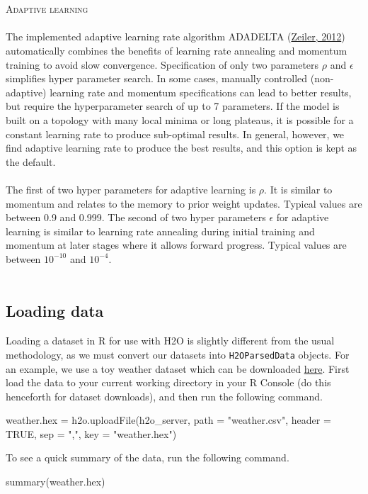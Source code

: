 \documentclass[12pt]{article}
\begin{document}
\\
\\
\textsc{Adaptive learning}
\\
\\
\noindent
The implemented adaptive learning rate algorithm ADADELTA (\href{http://arxiv.org/pdf/1212.5701v1.pdf}{Zeiler, 2012})  automatically combines the benefits of learning rate annealing and momentum training to avoid slow convergence. Specification of only two parameters $\rho$ and $\epsilon$  simplifies hyper parameter search. In some cases, manually controlled (non-adaptive) learning rate and momentum specifications can lead to better results, but require the hyperparameter search of up to 7 parameters. If the model is built on a topology with many local minima or long plateaus, it is possible for a constant learning rate to produce sub-optimal results. In general, however, we find adaptive learning rate to produce the best results, and this option is kept as the default. 
\\
\\
The first of two hyper parameters for adaptive learning is $\rho$. It is similar to momentum and relates to the memory to prior weight updates. Typical values are between 0.9 and 0.999. The second of two hyper parameters $\epsilon$ for adaptive learning is similar to learning rate annealing during initial training and momentum at later stages where it allows forward progress.
Typical values are between $10^{-10}$ and $10^{-4}$.
\\
\\
\subsection{Loading data}

Loading a dataset in R for use with H2O is slightly different from the usual methodology, as we must convert our datasets into \texttt{H2OParsedData} objects. For an example, we use a toy weather dataset which can be downloaded \href{https://raw.githubusercontent.com/0xdata/h2o/master/smalldata/weather.csv}{here}. First load the data to your current working directory in your R Console (do this henceforth for dataset downloads), and then run the following command.
\begin{spverbatim}
weather.hex = h2o.uploadFile(h2o_server, path = "weather.csv", header = TRUE, sep = ",", key = "weather.hex")
\end{spverbatim}
\bigskip
\noindent
To see a quick summary of the data, run the following command.
\begin{spverbatim}
summary(weather.hex)
\end{spverbatim}
\end{document}

